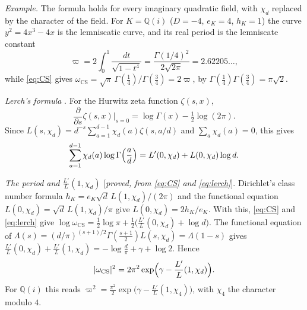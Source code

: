 \documentclass[11pt]{amsart}
\numberwithin{equation}{section}
\theoremstyle{definition}
\theoremstyle{remark}
\newcommand{\Q}{\mathbb Q}
\newcommand{\status}[1]{\textup{[\emph{#1}]}}
\begin{document}
\begin{itemize}[leftmargin=2em]
\emph{Example.} The formula holds for every imaginary quadratic field, with $\chi_d$ replaced by the character of the field. For $K=\Q(i)$ ($D=-4$, $e_K=4$, $h_K=1$) the curve $y^2=4x^3-4x$ is the lemniscatic curve, and its real period is the lemniscate constant
\begin{equation}
 \varpi=2\int_0^1\frac{dt}{\sqrt{1-t^4}}=\frac{\Gamma(1/4)^2}{2\sqrt{2\pi}}=2.62205\ldots,
\end{equation}
while \eqref{eq:CS} gives $\omega_{\mathrm{CS}}=\sqrt\pi\,\Gamma(\frac14)/\Gamma(\frac34)=2\varpi$, by $\Gamma(\frac14)\Gamma(\frac34)=\pi\sqrt2$.

\emph{Lerch's formula} \cite{Lerch}. For the Hurwitz zeta function $\zeta(s,x)$,
\begin{equation}
 \frac{\partial}{\partial s}\zeta(s,x)\Big|_{s=0}=\log\Gamma(x)-\tfrac12\log(2\pi).
\end{equation}
Since $L(s,\chi_d)=d^{-s}\sum_{a=1}^{d-1}\chi_d(a)\zeta(s,a/d)$ and $\sum_a\chi_d(a)=0$, this gives
\begin{equation}\label{eq:lerch}
 \sum_{a=1}^{d-1}\chi_d(a)\log\Gamma\Bigl(\frac ad\Bigr)=L'(0,\chi_d)+L(0,\chi_d)\log d .
\end{equation}

\emph{The period and $\frac{L'}L(1,\chi_d)$} \status{proved, from \eqref{eq:CS} and \eqref{eq:lerch}}. Dirichlet's class number formula $h_K=e_K\sqrt d\,L(1,\chi_d)/(2\pi)$ {\cite[Ch.~6, (15)]{Davenport}} and the functional equation $L(0,\chi_d)=\sqrt d\,L(1,\chi_d)/\pi$ {\cite[Ch.~9, (13)--(14)]{Davenport}} give $L(0,\chi_d)=2h_K/e_K$. With this, \eqref{eq:CS} and \eqref{eq:lerch} give $\log\omega_{\mathrm{CS}}=\frac12\log\pi+\frac12\bigl(\frac{L'}L(0,\chi_d)+\log d\bigr)$. The functional equation of $\Lambda(s)=(d/\pi)^{(s+1)/2}\Gamma(\frac{s+1}2)L(s,\chi_d)=\Lambda(1-s)$ gives $\frac{L'}L(0,\chi_d)+\frac{L'}L(1,\chi_d)=-\log\frac d\pi+\gamma+\log2$. Hence
\begin{equation}\label{eq:period}
 |\omega_{\mathrm{CS}}|^2=2\pi^2\exp\Bigl(\gamma-\frac{L'}{L}(1,\chi_d)\Bigr).
\end{equation}
For $\Q(i)$ this reads $\varpi^2=\frac{\pi^2}2\exp\bigl(\gamma-\frac{L'}L(1,\chi_4)\bigr)$, with $\chi_4$ the character modulo $4$.


\end{itemize}
\end{document}
